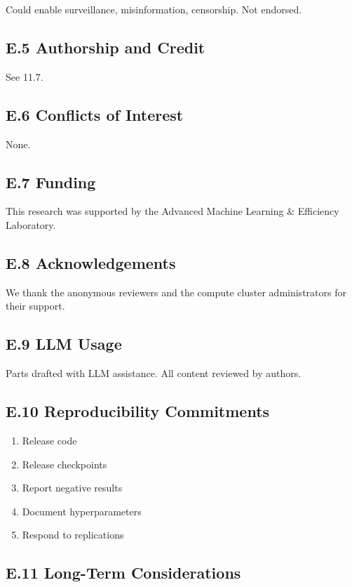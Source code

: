 Could enable surveillance, misinformation, censorship. Not endorsed.

\subsection{E.5 Authorship and Credit}

See  11.7.

\subsection{E.6 Conflicts of Interest}

None.

\subsection{E.7 Funding}

This research was supported by the Advanced Machine Learning \& Efficiency Laboratory.

\subsection{E.8 Acknowledgements}

We thank the anonymous reviewers and the compute cluster administrators for their support.

\subsection{E.9 LLM Usage}

Parts drafted with LLM assistance. All content reviewed by authors.

\subsection{E.10 Reproducibility Commitments}

\begin{enumerate}
\item Release code
\item Release checkpoints
\item Report negative results
\item Document hyperparameters
\item Respond to replications

\end{enumerate}
\subsection{E.11 Long-Term Considerations}

